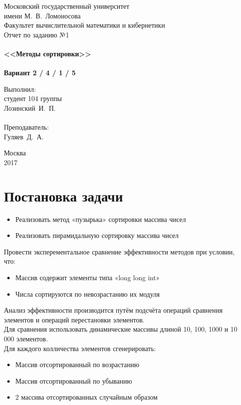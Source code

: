 \documentclass[a4paper,12pt,titlepage,finall]{article}
\begin{document}
\begin{titlepage}
    \begin{center}
	{\small \sc Московский государственный университет \\имени М.~В.~Ломоносова\\
	Факультет вычислительной математики и кибернетики\\}
	\vfill
	{\Large \sc Отчет по заданию №1}\\
	~\\
	{\large \bf <<Методы сортировки>>}\\ 
	~\\
	{\large \bf Вариант 2 / 4 / 1 / 5}
    \end{center}
    \begin{flushright}
	\vfill {Выполнил:\\
	студент 104 группы\\
	Лозинский~И.~П.\\
	~\\
	Преподаватель:\\
	Гуляев~Д.~А.}
    \end{flushright}
    \begin{center}
	\vfill
	{\small Москва\\2017}
    \end{center}
\end{titlepage}

\tableofcontents
\newpage

\section{Постановка задачи}

\begin{itemize}
\item Реализовать метод «пузырька» сортировки массива чисел
\item Реализовать пирамидальную сортировку массива чисел
\end{itemize}
Провести эксперементальное сравнение эффективности методов при условии, что:
\begin{itemize}
\item Массив содержит элементы типа «long long int»
\item Числа сортируются по невозрастанию их модуля
\end{itemize}
Анализ эффективности  производится путём подсчёта операций сравнения элементов и операций перестановки элементов.\\
Для сравнения использовать динамические массивы длиной 10, 100, 1000 и 10 000 элементов.\\
Для каждого колличества элементов сгенерировать:
\begin{itemize}
\item Массив отсортированный по возрастанию
\item Массив отсортированный по убыванию
\item 2 массива отсортированных случайным образом
\end{itemize}
\end{document}
